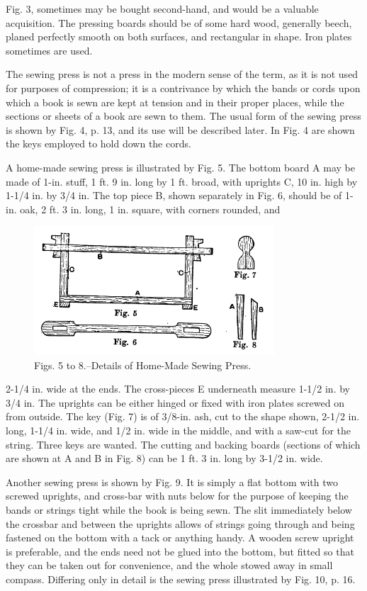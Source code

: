 \documentclass[twoside]{book}
\begin{document}
Fig. 3, sometimes may be bought second-hand, and
would be a valuable acquisition. The pressing
boards should be of some hard wood, generally
beech, planed perfectly smooth on both surfaces,
and rectangular in shape. Iron plates sometimes
are used.

The sewing press is not a press in the modern
sense of the term, as it is not used for purposes of
compression; it is a contrivance by which the bands
\pagebreak
or cords upon which a book is sewn are kept at
tension and in their proper places, while the sections
or sheets of a book are sewn to them. The usual
form of the sewing press is shown by Fig. 4, p. 13,
and its use will be described later. In Fig. 4 are
shown the keys employed to hold down the cords.

A home-made sewing press is illustrated by Fig.
5. The bottom board A may be made of 1-in. stuff,
1 ft. 9 in. long by 1 ft. broad, with uprights C, 10 in.
high by 1-1/4 in. by 3/4 in. The top piece B, shown
separately in Fig. 6, should be of 1-in. oak, 2 ft.
3 in. long, 1 in. square, with corners rounded, and
	\begin{figure}[h]
		\centering
		\includegraphics[width=0.8\textwidth]{Figures/_005-008.png}
		\caption*{Figs. 5 to 8.--Details of Home-Made Sewing Press.}
	\end{figure}
2-1/4 in. wide at the ends. The cross-pieces E
underneath measure 1-1/2 in. by 3/4 in. The uprights can be
either hinged or fixed with iron plates screwed on
from outside. The key (Fig. 7) is of 3/8-in. ash, cut
to the shape shown, 2-1/2 in. long, 1-1/4 in. wide, and
1/2 in. wide in the middle, and with a saw-cut for the
string. Three keys are wanted. The cutting and
backing boards (sections of which are shown at A
and B in Fig. 8) can be 1 ft. 3 in. long by 3-1/2 in. wide.

Another sewing press is shown by Fig. 9. It is
simply a flat bottom with two screwed uprights,
and cross-bar with nuts below for the purpose of
keeping the bands or strings tight while the book is
\pagebreak
being sewn. The slit immediately below the crossbar
and between the uprights allows of strings going
through and being fastened on the bottom with a
tack or anything handy. A wooden screw upright is
preferable, and the ends need not be glued into
the bottom, but fitted so that they can be taken out
for convenience, and the whole stowed away in
small compass. Differing only in detail is the
sewing press illustrated by Fig. 10, p. 16.
\end{document}
